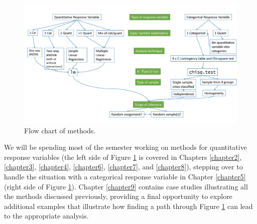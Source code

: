 \documentclass[
]{book}
\begin{document}
\begin{figure}[ht!]

{\centering \includegraphics[width=0.75\linewidth]{chapter1_files/decisiontree} 

}

\caption{Flow chart of methods.}\label{fig:Figure1-1}
\end{figure}

\indent We will be spending most of the semester working on methods for quantitative
response variables (the
left side of Figure \ref{fig:Figure1-1} is covered in Chapters \ref{chapter2},
\ref{chapter3}, \ref{chapter4}, \ref{chapter6}, \ref{chapter7}, and
\ref{chapter8}), stepping
over to handle the situation with a categorical response variable in Chapter \ref{chapter5} (right side
of Figure \ref{fig:Figure1-1}).
Chapter \ref{chapter9} contains case studies
illustrating all the methods discussed previously, providing a final opportunity
to explore additional examples that illustrate how finding a
path through Figure \ref{fig:Figure1-1} can lead to the appropriate analysis.
\end{document}
